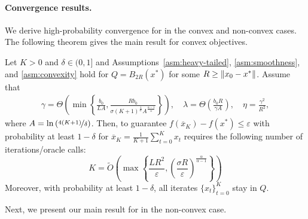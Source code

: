 \documentclass{article}
\begin{document}
\paragraph{Convergence results.} We derive high-probability convergence for  in the convex and non-convex cases. The following theorem gives the main result for convex objectives.

\begin{theorem}\label{thm:main_result_cvx_main}
    Let $K > 0$ and $\delta \in (0,1]$ and Assumptions~\ref{asm:heavy-tailed}, \ref{asm:smoothness}, and \ref{asm:convexity} hold for $Q = B_{2R}(x^*)$ for some $R \geq \left\lVert x_0 - x^*\right\rVert$. Assume that 
    \begin{gather}
        \gamma = \Theta\left(\min\left\{\frac{b_{0}}{L A}, \frac{R b_{0}}{\sigma (K+1)^{\frac{1}{\alpha}} A^{\frac{\alpha - 1}{\alpha}}}\right\}\right),\quad \lambda = \Theta\left(\frac{b_{0}R}{\gamma A}\right),\quad \eta = \frac{\gamma^2}{R^2},
    \end{gather}
    where $A = \ln\left(\nicefrac{4(K+1)}{\delta}\right)$. Then, to guarantee $f(\overline{x}_K) - f(x^*) \leq \varepsilon$ with probability at least $1 - \delta$ for $\overline{x}_K = \tfrac{1}{K+1}\sum_{t=0}^K x_t$  requires the following number of iterations/oracle calls:
    \begin{equation}
        K = \widetilde{O}\left(\max\left\{ \frac{LR^2}{\varepsilon}, \left(\frac{\sigma R}{\varepsilon}\right)^{\frac{\alpha}{\alpha - 1}} \right\}\right) \label{eq:complexity_cvx}
    \end{equation}
    Moreover, with probability at least $1-\delta$, all iterates $\{x_t\}_{t=0}^K$ stay in $Q$.
\end{theorem}


Next, we present our main result for  in the non-convex case.
\end{document}

